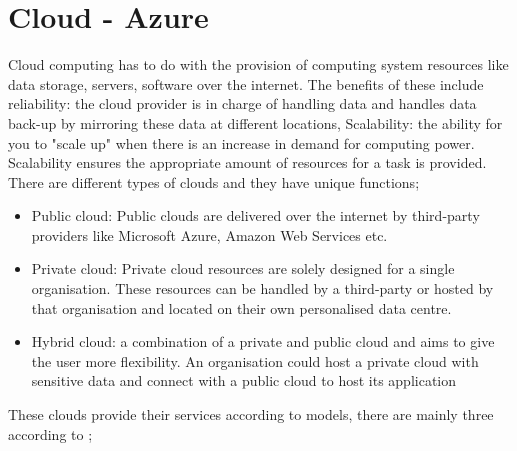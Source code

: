 \section{Cloud - Azure}
Cloud computing has to do with the provision of computing system resources like data storage, servers, software over the internet\cite{Cloudcom53:online}. The benefits of these include reliability: the cloud provider is in charge of handling data and handles data back-up by mirroring these data at different locations, Scalability: the ability for you to "scale up" when there is an increase in demand for computing power. Scalability ensures the appropriate amount of resources for a task is provided. 
There are different types of clouds and they have unique functions;
\begin{itemize}
\item Public cloud: Public clouds  are delivered over the internet by third-party providers like Microsoft Azure, Amazon Web Services etc.
\item Private cloud: Private cloud resources are solely designed for a single organisation. These resources can be handled by a third-party or hosted by that organisation and located on their own personalised data centre.
\item Hybrid cloud: a combination of a private and public cloud and aims to give the user more flexibility. An organisation could host a private cloud with sensitive data and connect with a public cloud to host its application
\end{itemize}
These clouds provide their services according to models, there are mainly three according to \cite{National47:online};
